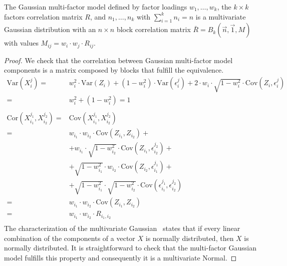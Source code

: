 \documentclass[11pt,fleqn]{book} %
\begin{document}
\begin{proposition}
	\label{prop:gmfigs}
	The Gaussian multi-factor model defined by factor loadings 
	$w_1,\dots,w_k$, the $k {\times} k$ factors correlation matrix $R$, and
	$n_1,\dots,n_k$ with $\sum_{i=1}^k n_i = n$ is a multivariate Gaussian 
	distribution with an $n {\times} n$ block correlation matrix 
	$\bar{R}=B_k(\vec{n},\vec{1},M)$ with values
	$M_{ij} = w_i \cdot w_j \cdot R_{ij}$.
\end{proposition}
\begin{proof}
	We check that the correlation between Gaussian multi-factor model
	components is a matrix composed by blocks that fulfill the equivalence.
	\begin{displaymath}
		\begin{array}{rl}
			\text{Var}(X_i^j) =                       &
			w_i^2 \cdot \text{Var}(Z_i) + (1-w_i^2) \cdot \text{Var}(\epsilon_i^j) +
			2 \cdot w_i \cdot \sqrt{1-w_i^2} \cdot \text{Cov}(Z_i, \epsilon_i^j)    \\
			=                                         & w_i^2 + (1-w_i^2) = 1       \\
			                                          &                             \\
			\text{Cor}(X_{i_1}^{j_1},X_{i_2}^{j_2}) = & \text{Cov}(X_{i_1}^{j_1},X_{i_2}^{j_2})                                                                    \\
			=                                         & w_{i_1} \cdot w_{i_2} \cdot \text{Cov}(Z_{i_1},Z_{i_2}) +                                                  \\
			                                          & + w_{i_1} \cdot \sqrt{1-w_{i_2}^2} \cdot \text{Cov}(Z_{i_1}, \epsilon_{i_2}^{j_2}) +                       \\
			                                          & + \sqrt{1-w_{i_1}^2} \cdot w_{i_2} \cdot \text{Cov}(Z_{i_2}, \epsilon_{i_1}^{j_1}) +                       \\
			                                          & + \sqrt{1-w_{i_1}^2} \cdot \sqrt{1-w_{i_2}^2} \cdot \text{Cov}(\epsilon_{i_1}^{j_1}, \epsilon_{i_2}^{j_2}) \\
			=                                         & w_{i_1} \cdot w_{i_2} \cdot \text{Cov}(Z_{i_1}, Z_{i_2})                                                   \\
			=                                         & w_{i_1} \cdot w_{i_2} \cdot R_{i_1,i_2}                                                                    \\
		\end{array}
	\end{displaymath}
	The characterization of the multivariate Gaussian~\cite[thm. 2.6.2]{anderson:1984}
	states that if every linear combination of the components of a 
	vector $X$ is normally distributed, then $X$ is normally distributed.
	It is straightforward to check that the multi-factor Gaussian model 
	fulfills this property and consequently it is a multivariate Normal.
\end{proof}
\end{document}
